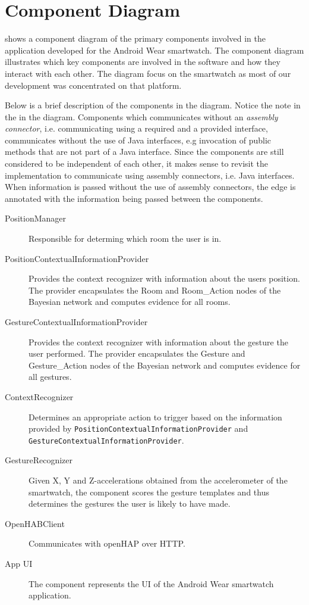 \section{Component Diagram}
\label{sec:implementation:component-diagram}

 shows a component diagram of the primary components involved in the application developed for the Android Wear smartwatch. The component diagram illustrates which key components are involved in the software and how they interact with each other.
The diagram focus on the smartwatch as most of our development was concentrated on that platform.

Below is a brief description of the components in the diagram. Notice the note in the in the diagram. Components which communicates without an \emph{assembly connector}, i.e. communicating using a required and a provided interface, communicates without the use of Java interfaces, e.g invocation of public methods that are not part of a Java interface. Since the components are still considered to be independent of each other, it makes sense to revisit the implementation to communicate using assembly connectors, i.e. Java interfaces. When information is passed without the use of assembly connectors, the edge is annotated with the information being passed between the components.

\begin{description}
\item[PositionManager] Responsible for determing which room the user is in.
\item[PositionContextualInformationProvider] Provides the context recognizer with information about the users position. The provider encapsulates the Room and Room\_Action nodes of the Bayesian network and computes evidence for all rooms.
\item[GestureContextualInformationProvider] Provides the context recognizer with information about the gesture the user performed. The  provider encapsulates the Gesture and Gesture\_Action nodes of the Bayesian network and computes evidence for all gestures.
\item[ContextRecognizer] Determines an appropriate action to trigger based on the information provided by \texttt{PositionContextualInformationProvider} and \texttt{GestureContextualInformationProvider}.
\item[GestureRecognizer] Given X, Y and Z-accelerations obtained from the accelerometer of the smartwatch, the component scores the gesture templates and thus determines the gestures the user is likely to have made.
\item[OpenHABClient] Communicates with openHAP over HTTP.
\item[App UI] The component represents the UI of the Android Wear smartwatch application.
\end{description}

